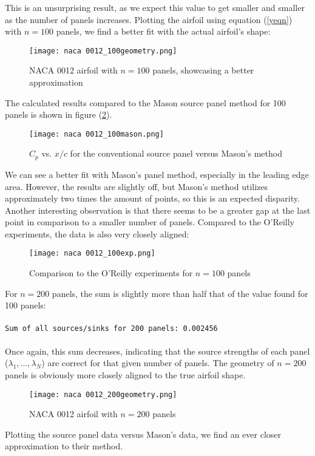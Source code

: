 \documentclass[12pt]{article}
\begin{document}
\noindent This is an unsurprising result, as we expect this value to get smaller and smaller as the number of panels increases. Plotting the airfoil using equation (\ref{yeqn}) with $n = 100$ panels, we find a better fit with the actual airfoil's shape:
\begin{figure}[H]
    \centering
    \texttt{[image: naca 0012\_100geometry.png]}
    \caption{NACA 0012 airfoil with $n = 100$ panels, showcasing a better approximation}
    \label{fig:100geo}
\end{figure}
\noindent The calculated results compared to the Mason source panel method for 100 panels is shown in figure (\ref{100mason}). 
\begin{figure}[H]
    \centering
    \texttt{[image: naca 0012\_100mason.png]}
    \caption{$C_p$ vs. $x/c$ for the conventional source panel versus Mason's method}
    \label{100mason}
\end{figure}
\noindent We can see a better fit with Mason's panel method, especially in the leading edge area. However, the results are slightly off, but Mason's method utilizes approximately two times the amount of points, so this is an expected disparity. Another interesting observation is that there seems to be a greater gap at the last point in comparison to a smaller number of panels. Compared to the O'Reilly experiments, the data is also very closely aligned:
\begin{figure}[H]
    \centering
    \texttt{[image: naca 0012\_100exp.png]}
    \caption{Comparison to the O'Reilly experiments for $n = 100$ panels}
    \label{100exp}
\end{figure}
\noindent For $n = 200$ panels, the sum is slightly more than half that of the value found for 100 panels: \\ \\
\texttt{Sum of all sources/sinks for 200 panels: 0.002456} \\ \\
Once again, this sum decreases, indicating that the source strengths of each panel ($\lambda_1, \dots , \lambda_N$) are correct for that given number of panels. The geometry of $n = 200$ panels is obviously more closely aligned to the true airfoil shape.
\begin{figure}[H]
    \centering
    \texttt{[image: naca 0012\_200geometry.png]}
    \caption{NACA 0012 airfoil with $n = 200$ panels}
    \label{fig:my_label}
\end{figure}
\noindent Plotting the source panel data versus Mason's data, we find an ever closer approximation to their method.
\end{document}
